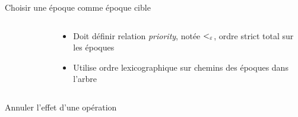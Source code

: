 \begin{frame}{Choisir une époque comme époque cible}
\begin{columns}
\begin{column}{0.3 \textwidth}
\begin{figure}
{
        }
      \end{figure}
    \end{column}
    \begin{column}{0.7 \textwidth}
      \begin{itemize}
        \item Doit définir relation \emph{priority}, notée $<_{\varepsilon}$, ordre strict total sur les époques
        \item Utilise ordre lexicographique sur chemins des époques dans l'arbre
      \end{itemize}
    \end{column}
  \end{columns}
\end{frame}

\begin{frame}{Annuler l'effet d'une opération \ren}
\end{frame}


